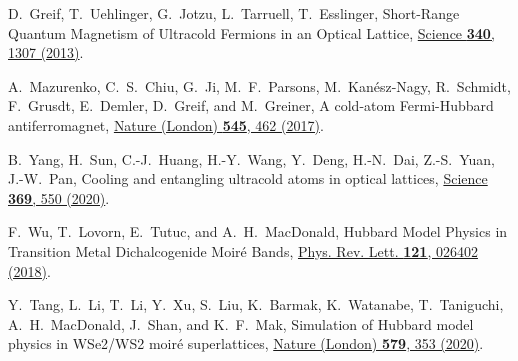 \documentclass[twocolumn,english,prl,floatfix,citeautoscript,nofootinbib]{revtex4}
\begin{document}
\begin{thebibliography}{999}


 D.~Greif, T.~Uehlinger, G.~Jotzu, L.~Tarruell,
T.~Esslinger, Short-Range Quantum Magnetism of Ultracold Fermions in an
Optical Lattice, \href{https://doi.org/10.1126/science.1236362}{Science
\textbf{340}, 1307 (2013)}.

 A.~Mazurenko, C.~S.~Chiu, G.~Ji, M.~F.~Parsons,
M.~Kan\'esz-Nagy, R.~Schmidt, F.~Grusdt, E.~Demler, D.~Greif, and
M.~Greiner, A cold-atom Fermi-Hubbard antiferromagnet, \href{https://doi.org/10.1038/nature22362}%
{Nature (London) \textbf{545}, 462 (2017)}.

 B.~Yang, H.~Sun, C.-J.~Huang, H.-Y.~Wang, Y.~Deng,
H.-N.~Dai, Z.-S.~Yuan, J.-W.~Pan, Cooling and entangling ultracold atoms in
optical lattices, \href{https://doi.org/10.1126/science.aaz6801}{Science \textbf{369}, 550
(2020)}.



 F.~Wu, T.~Lovorn, E.~Tutuc, and
A.~H.~MacDonald, Hubbard Model Physics in Transition Metal Dichalcogenide
Moir\'e Bands, \href{https://doi.org/10.1103/PhysRevLett.119.247402}{Phys.
Rev. Lett. \textbf{121}, 026402 (2018)}.

 Y.~Tang, L.~Li, T.~Li, Y.~Xu, S.~Liu, K.~Barmak,
K.~Watanabe, T.~Taniguchi, A.~H.~MacDonald, J.~Shan, and K.~F.~Mak,
Simulation of Hubbard model physics in WSe2/WS2 moir\'e superlattices, \href{https://doi.org/10.1038/s41586-020-2085-3}%
{Nature (London) \textbf{579}, 353 (2020)}.


\end{thebibliography}

\newpage
\end{document}
